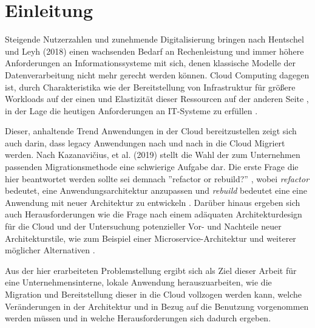 \chapter{Einleitung}
Steigende Nutzerzahlen und zunehmende Digitalisierung bringen nach Hentschel und Leyh (2018) einen wachsenden Bedarf an Rechenleistung und immer höhere Anforderungen an Informationssysteme mit sich, denen klassische Modelle der Datenverarbeitung nicht mehr gerecht werden können. Cloud Computing dagegen ist, durch Charakteristika wie der Bereitstellung von Infrastruktur für größere Workloads auf der einen und Elastizität dieser Ressourcen auf der anderen Seite \cite[Vgl.][S. 2]{Mell2011}, in der Lage die heutigen Anforderungen an IT-Systeme zu erfüllen \cite[Vgl.][S. 6]{Reinheimer2018}.

Dieser, anhaltende Trend Anwendungen in der Cloud bereitzustellen zeigt sich auch darin, dass legacy Anwendungen nach und nach in die Cloud Migriert werden. Nach Kazanavičius, et al. (2019) stellt die Wahl der zum Unternehmen passenden Migrationsmethode eine schwierige Aufgabe dar. Die erste Frage die hier beantwortet werden sollte sei demnach ''refactor or rebuild?'' \cite[Vgl.][S. 4]{Kazanavicius2019}, wobei \textit{refactor} bedeutet, eine Anwendungsarchitektur anzupassen und \textit{rebuild} bedeutet eine eine Anwendung mit neuer Architektur zu entwickeln \cite[Vgl.][S. 2]{Ahmad2018}. Darüber hinaus ergeben sich auch Herausforderungen wie die Frage nach einem adäquaten Architekturdesign für die Cloud \cite[Vgl.][S. 14]{Pahl} und der Untersuchung potenzieller Vor- und Nachteile neuer Architekturstile, wie zum Beispiel einer Microservice-Architektur und weiterer möglicher Alternativen \cite[Vgl.][S. 3]{Carrasco2018}.

Aus der hier erarbeiteten Problemstellung ergibt sich als Ziel dieser Arbeit für eine Unternehmensinterne, lokale Anwendung herauszuarbeiten, wie die Migration und Bereitstellung dieser in die Cloud vollzogen werden kann, welche Veränderungen in der Architektur und in Bezug auf die Benutzung vorgenommen werden müssen und in welche Herausforderungen sich dadurch ergeben.

